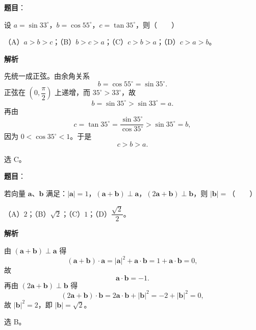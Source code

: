 \begin{answer}

\textbf{题目}：

设 $a=\sin33^\circ$，$b=\cos55^\circ$，$c=\tan35^\circ$，则\mbox{（　　）}

（A）$a>b>c$；（B）$b>c>a$；（C）$c>b>a$；（D）$c>a>b$。

\textbf{解析}

先统一成正弦。由余角关系
\nopagebreak[4]
\[b=\cos55^\circ=\sin35^\circ.\]
正弦在 $\left(0,\dfrac\pi2\right)$ 上递增，而 $35^\circ>33^\circ$，故
\nopagebreak[4]
\[b=\sin35^\circ>\sin33^\circ=a.\]
再由
\nopagebreak[4]
\[c=\tan35^\circ=\frac{\sin35^\circ}{\cos35^\circ}>\sin35^\circ=b,\]
因为 $0<\cos35^\circ<1$。于是
\nopagebreak[4]
\[c>b>a.\]

选 C。


\end{answer}
\begin{answer}

\textbf{题目}：

若向量 $\boldsymbol a$、$\boldsymbol b$ 满足：$|\boldsymbol a|=1$，$(\boldsymbol a+\boldsymbol b)\perp\boldsymbol a$，$(2\boldsymbol a+\boldsymbol b)\perp\boldsymbol b$，则 $|\boldsymbol b|=$\mbox{（　　）}

（A）$2$；（B）$\sqrt2$；（C）$1$；（D）$\dfrac{\sqrt2}{2}$。

\textbf{解析}

由 $(\boldsymbol a+\boldsymbol b)\perp\boldsymbol a$ 得
\nopagebreak[4]
\[(\boldsymbol a+\boldsymbol b)\cdot\boldsymbol a=|\boldsymbol a|^2+\boldsymbol a\cdot\boldsymbol b=1+\boldsymbol a\cdot\boldsymbol b=0,\]
故
\nopagebreak[4]
\[\boldsymbol a\cdot\boldsymbol b=-1.\]
再由 $(2\boldsymbol a+\boldsymbol b)\perp\boldsymbol b$ 得
\nopagebreak[4]
\[(2\boldsymbol a+\boldsymbol b)\cdot\boldsymbol b=2\boldsymbol a\cdot\boldsymbol b+|\boldsymbol b|^2=-2+|\boldsymbol b|^2=0,\]
故 $|\boldsymbol b|^2=2$，即 $|\boldsymbol b|=\sqrt2$。

选 B。


\end{answer}
